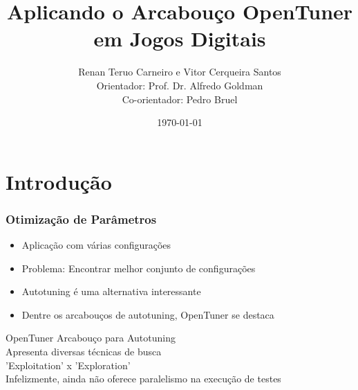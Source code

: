 \documentclass[10pt]{beamer}
\title{Aplicando o Arcabouço OpenTuner em Jogos Digitais}
\date{\today}
\author{Renan Teruo Carneiro e Vitor Cerqueira Santos\\
	Orientador: Prof. Dr. Alfredo Goldman\\
    Co-orientador: Pedro Bruel}
\institute{Instituto de Matemática e Estatística}
\begin{document}
\maketitle


\section{Introdução}

\begin{frame}[fragile]
	\frametitle{Otimização de Parâmetros}
	  \begin{itemize}[<+- | alert@+>]
	  	\item Aplicação com várias configurações
	  	\item Problema: Encontrar melhor conjunto de configurações
	  	\item Autotuning é uma alternativa interessante
	  	\item Dentre os arcabouços de autotuning, OpenTuner se destaca
	  \end{itemize}
\end{frame}

\begin{frame}{OpenTuner}
	Arcabouço para Autotuning\pause\\
	Apresenta diversas técnicas de busca\pause\\
	'Exploitation' x 'Exploration'\pause\\
	Infelizmente, ainda não oferece paralelismo na execução de testes
\end{frame}
\end{document}
